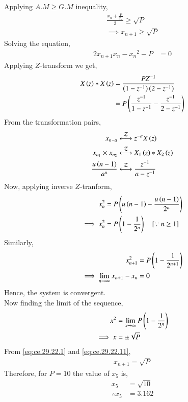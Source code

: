 \documentclass[journal,12pt,twocolumn]{IEEEtran}
\theoremstyle{remark}
\begin{document}
Applying $A.M \geq G.M$ inequality,
\begin{align}
    \frac{x_n+\frac{P}{x_n}}{2} \geq \sqrt{P}   \\
    \implies x_{n+1} \geq \sqrt{P}  \label{eq:ce.29.22.1}
\end{align}
Solving the equation,
\begin{align}
    2x_{n+1}x_{n} - {x_n}^2 - P &=0
\end{align}
Applying $Z$-transform we get,
\begin{align}
    X\left(z\right) \ast X\left(z\right) &= \frac{PZ^{-1}}{\left(1-z^{-1}\right)\left(2-z^{-1}\right)}  \\
    &= P\left(\frac{z^{-1}}{1-z^{-1}} - \frac{z^{-1}}{2-z^{-1}}\right)
\end{align}
From the transformation pairs,
\begin{align}
    x_{n-a} &\overset{\mathcal{Z}}{ \longleftrightarrow} z^{-a}X\left(z\right)  \\
    x_{n_1}\times x_{n_2} &\overset{\mathcal{Z}}{ \longleftrightarrow} X_1\left(z\right)\ast X_2\left(z\right) \\
    \frac{u\left(n-1\right)}{a^{n}} &\overset{\mathcal{Z}}{ \longleftrightarrow} \frac{z^{-1}}{a-z^{-1}}
\end{align}
Now, applying inverse $Z$-tranform,
\begin{align}
    x_n^2 &= P\left(u\left(n-1\right) - \frac{u\left(n-1\right)}{2^n}\right)  \\
    \implies x_n^2 &=P\left(1-\frac{1}{2^n}\right) \quad \text{[$\because n \geq 1$]}
\end{align}
Similarly,
\begin{align}
    x_{n+1}^2 &= P\left(1 - \frac{1}{2^{n+1}}\right)  \\
    \implies \lim\limits_{n\to\infty}{x_{n+1} - x_n} &= 0
\end{align}
Hence, the system is convergent.    \\
Now finding the limit of the sequence,
\begin{align}
    x^2 &=\lim\limits_{x\to\infty}P\left(1-\frac{1}{2^n}\right)   \\
    \implies x &= \pm\sqrt{P}   \label{eq:ce.29.22.11}
\end{align}
From \eqref{eq:ce.29.22.1} and \eqref{eq:ce.29.22.11},
\begin{align}
    x_{n+1}=\sqrt{P}
\end{align}
Therefore, for $P=10$ the value of $x_5$ is,
\begin{align}
    x_5&=\sqrt{10}  \\
    \therefore x_5&=3.162
\end{align}
\end{document}
